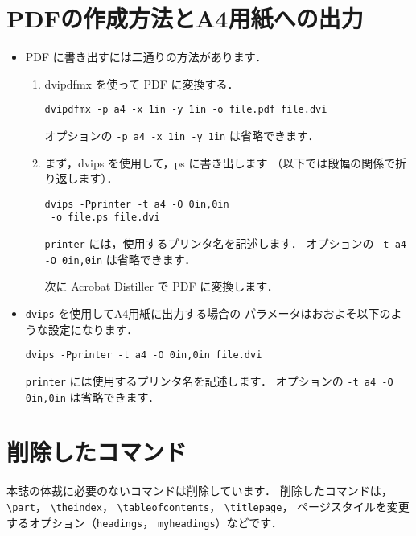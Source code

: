 \documentclass[technicalreport]{ieicej}
\begin{document}
\appendix
\section{PDFの作成方法とA4用紙への出力}

\begin{itemize}
\item 
PDF に書き出すには二通りの方法があります．
\begin{enumerate}
\item
dvipdfmx を使って PDF に変換する．
\begin{verbatim}
dvipdfmx -p a4 -x 1in -y 1in -o file.pdf file.dvi
\end{verbatim}
オプションの \texttt{-p a4 -x 1in -y 1in} は省略できます．

\item
まず，dvips を使用して，ps に書き出します
（以下では段幅の関係で折り返します）．
\begin{verbatim}
dvips -Pprinter -t a4 -O 0in,0in
 -o file.ps file.dvi
\end{verbatim}
\texttt{printer} には，使用するプリンタ名を記述します．
オプションの \texttt{-t a4 -O 0in,0in} は省略できます．

次に Acrobat Distiller で PDF に変換します．
\end{enumerate}

\item
\texttt{dvips} を使用してA4用紙に出力する場合の
パラメータはおおよそ以下のような設定になります．
\begin{verbatim}
dvips -Pprinter -t a4 -O 0in,0in file.dvi
\end{verbatim}
\texttt{printer} には使用するプリンタ名を記述します．
オプションの \texttt{-t a4 -O 0in,0in} は省略できます．
\end{itemize}

%
%

\section{削除したコマンド}

本誌の体裁に必要のないコマンドは削除しています．
削除したコマンドは，\verb/\part/，\allowbreak
\verb/\theindex/，\allowbreak
\verb/\tableofcontents/，\allowbreak
\verb/\titlepage/，\allowbreak
ページスタイルを変更するオプション（\texttt{headings}，
\texttt{myheadings}）などです．
\end{document}
